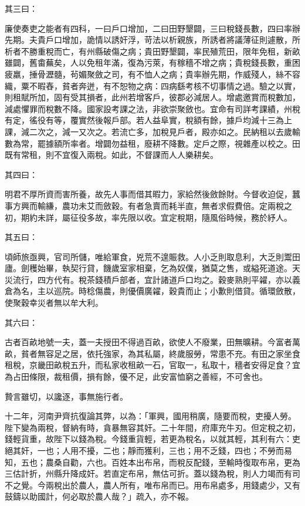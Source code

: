 \begin{pinyinscope}
 其三曰：



 廉使奏吏之能者有四科，一曰戶口增加，二曰田野墾闢，三曰稅錢長數，四曰率辦先期。夫貴戶口增加，詭情以誘奸浮，苛法以析親族，所誘者將議薄征則遽散，所析者不勝重稅而亡，有州縣破傷之病；貴田野墾闢，率民殖荒田，限年免租，新畝雖闢，舊畬蕪矣，人以免租年滿，復為污萊，有稼穡不增之病；貴稅錢長數，重困疲羸，捶骨瀝髓，茍媚聚斂之司，有不恤人之病；貴率辦先期，作威殘人，絲不容織，粟不暇舂，貧者奔迸，有不恕物之病：四病繇考核不切事情之過。驗之以實，則租賦所加，固有受其損者，此州若增客戶，彼郡必減居人。增處邀賞而稅數加，減處懼罪而稅數不降。國家設考課之法，非欲崇聚斂也。宜命有司詳考課績，州稅有定，徭役有等，覆實然後報戶部。若人益阜實，稅額有餘，據戶均減十三為上課，減二次之，減一又次之。若流亡多，加稅見戶者，殿亦如之。民納租以去歲輸數為常，罷據額所率者。增闢勿益租，廢耕不降數。定戶之際，視雜產以校之。田既有常租，則不宜復入兩稅。如此，不督課而人人樂耕矣。



 其四曰：



 明君不厚所資而害所養，故先人事而借其暇力，家給然後斂餘財。今督收迫促，蠶事方興而輸縑，農功未艾而斂穀。有者急賣而耗半直，無者求假費倍。定兩稅之初，期約未詳，屬征役多故，率先限以收。宜定稅期，隨風俗時候，務於紓人。



 其五曰：



 頃師旅亟興，官司所儲，唯給軍食，兇荒不遑賑救。人小乏則取息利，大乏則鬻田廬。劍穫始畢，執契行貸，饑歲室家相棄，乞為奴僕，猶莫之售，或縊死道途。天災流行，四方代有。稅茶錢積戶部者，宜計諸道戶口均之。穀麥熟則平糴，亦以義倉為名，主以巡院。時稔傷農，則優價廣糴，穀貴而止；小歉則借貸。循環斂散，使聚穀幸災者無以牟大利。



 其六曰：



 古者百畝地號一夫，蓋一夫授田不得過百畝，欲使人不廢業，田無曠耕。今富者萬畝，貧者無容足之居，依托強家，為其私屬，終歲服勞，常患不充。有田之家坐食租稅，京畿田畝稅五升，而私家收租畝一石，官取一，私取十，穡者安得足食？宜為占田條限，裁租價，損有餘，優不足，此安富恤窮之善經，不可舍也。



 贄言雖切，以讒逐，事無施行者。



 十二年，河南尹齊抗復論其弊，以為：「軍興，國用稍廣，隨要而稅，吏擾人勞。陛下變為兩稅，督納有時，貪暴無容其奸。二十年間，府庫充牛刃。但定稅之初，錢輕貨重，故陛下以錢為稅。今錢重貨輕，若更為稅名，以就其輕，其利有六：吏絕其奸，一也；人用不擾，二也；靜而獲利，三也；用不乏錢，四也；不勞而易知，五也；農桑自勸，六也。百姓本出布帛，而稅反配錢，至輸時復取布帛，更為三估計折，州縣升降成奸。若直定布帛，無估可折。蓋以錢為稅，則人力竭而有司不之覺。今兩稅出於農人，農人所有，唯布帛而已。用布帛處多，用錢處少，又有鼓鑄以助國計，何必取於農人哉？」疏入，亦不報。




\end{pinyinscope}
